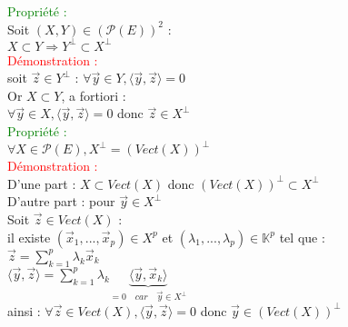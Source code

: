 \documentclass{article}
\begin{document}
\textcolor{green}{Propriété :} \\
Soit $(X,Y) \in (\mathcal P(E))^2$ : \\
$X \subset Y \Rightarrow Y^{\perp} \subset X^{\perp}$ \\
\textcolor{red}{Démonstration :} \\
soit $\vec z \in Y^{\perp}$ : $\forall \vec y \in Y, \langle \vec y, \vec z \rangle =0$ \\
Or $X \subset Y$, a fortiori : \\
$\forall \vec y \in X, \langle \vec y, \vec z \rangle=0$ donc $\vec z \in X^{\perp}$ \\
 \textcolor{green}{Propriété :} \\
 $\forall X \in \mathcal P(E), X^{\perp}=(Vect(X))^{\perp}$ \\
 \textcolor{red}{Démonstration :} \\
 D'une part : $X\subset Vect(X)$ donc $(Vect(X))^{\perp} \subset X^{\perp}$ \\
 D'autre part : pour $\vec y \in X^{\perp}$ \\
 Soit $\vec z \in Vect(X)$ : \\
 il existe $(\vec x_1,...,\vec x_p) \in X^p$ et $(\lambda_1,...,\lambda_p) \in \mathbb K^p$ tel que : \\
 $\vec z= \sum_{k=1}^p \lambda_k \vec x_k$ \\
 $\langle \vec y, \vec z \rangle = \sum_{k=1}^p \lambda_k \underbrace{ \langle \vec y, \vec x_k \rangle}_{=0 \quad car \quad \vec y \in X^{\perp}}$ \\
 ainsi : $\forall \vec z \in Vect(X), \langle \vec y, \vec z \rangle =0$ donc $\vec y \in (Vect(X))^{\perp}$
\end{document}
